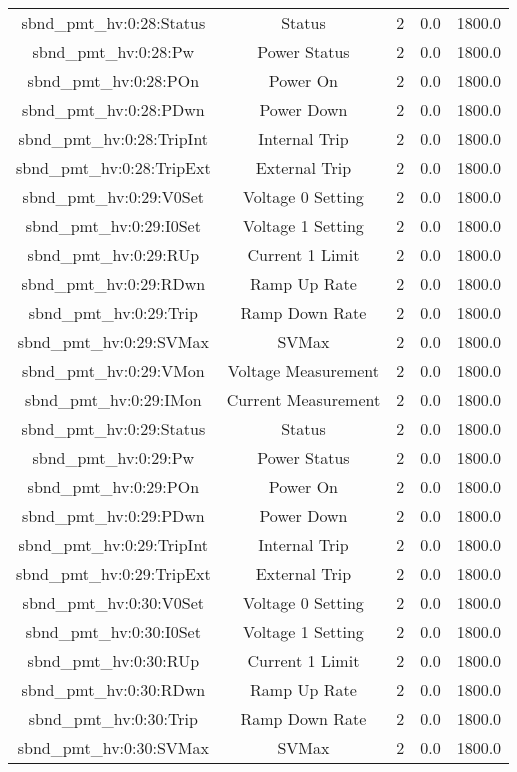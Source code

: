 \begin{center}
\begin{longtable}{c | c c c c }
sbnd\_pmt\_hv:0:28:Status & Status & 2 & 0.0 & 1800.0\\ 
sbnd\_pmt\_hv:0:28:Pw & Power Status & 2 & 0.0 & 1800.0\\ 
sbnd\_pmt\_hv:0:28:POn & Power On & 2 & 0.0 & 1800.0\\ 
sbnd\_pmt\_hv:0:28:PDwn & Power Down & 2 & 0.0 & 1800.0\\ 
sbnd\_pmt\_hv:0:28:TripInt & Internal Trip & 2 & 0.0 & 1800.0\\ 
sbnd\_pmt\_hv:0:28:TripExt & External Trip & 2 & 0.0 & 1800.0\\ 
sbnd\_pmt\_hv:0:29:V0Set & Voltage 0 Setting & 2 & 0.0 & 1800.0\\ 
sbnd\_pmt\_hv:0:29:I0Set & Voltage 1 Setting & 2 & 0.0 & 1800.0\\ 
sbnd\_pmt\_hv:0:29:RUp & Current 1 Limit & 2 & 0.0 & 1800.0\\ 
sbnd\_pmt\_hv:0:29:RDwn & Ramp Up Rate & 2 & 0.0 & 1800.0\\ 
sbnd\_pmt\_hv:0:29:Trip & Ramp Down Rate & 2 & 0.0 & 1800.0\\ 
sbnd\_pmt\_hv:0:29:SVMax & SVMax & 2 & 0.0 & 1800.0\\ 
sbnd\_pmt\_hv:0:29:VMon & Voltage Measurement & 2 & 0.0 & 1800.0\\ 
sbnd\_pmt\_hv:0:29:IMon & Current Measurement & 2 & 0.0 & 1800.0\\ 
sbnd\_pmt\_hv:0:29:Status & Status & 2 & 0.0 & 1800.0\\ 
sbnd\_pmt\_hv:0:29:Pw & Power Status & 2 & 0.0 & 1800.0\\ 
sbnd\_pmt\_hv:0:29:POn & Power On & 2 & 0.0 & 1800.0\\ 
sbnd\_pmt\_hv:0:29:PDwn & Power Down & 2 & 0.0 & 1800.0\\ 
sbnd\_pmt\_hv:0:29:TripInt & Internal Trip & 2 & 0.0 & 1800.0\\ 
sbnd\_pmt\_hv:0:29:TripExt & External Trip & 2 & 0.0 & 1800.0\\ 
sbnd\_pmt\_hv:0:30:V0Set & Voltage 0 Setting & 2 & 0.0 & 1800.0\\ 
sbnd\_pmt\_hv:0:30:I0Set & Voltage 1 Setting & 2 & 0.0 & 1800.0\\ 
sbnd\_pmt\_hv:0:30:RUp & Current 1 Limit & 2 & 0.0 & 1800.0\\ 
sbnd\_pmt\_hv:0:30:RDwn & Ramp Up Rate & 2 & 0.0 & 1800.0\\ 
sbnd\_pmt\_hv:0:30:Trip & Ramp Down Rate & 2 & 0.0 & 1800.0\\ 
sbnd\_pmt\_hv:0:30:SVMax & SVMax & 2 & 0.0 & 1800.0\\ 

\end{longtable}
\end{center}
